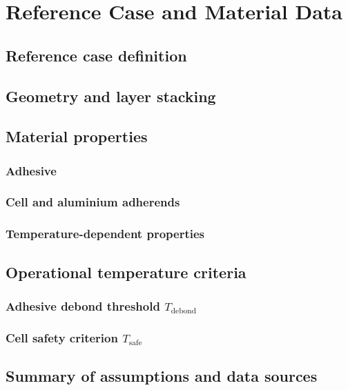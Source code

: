 \chapter{Reference Case and Material Data}

\section{Reference case definition}

\section{Geometry and layer stacking}

\section{Material properties}

\subsection{Adhesive}

\subsection{Cell and aluminium adherends}

\subsection{Temperature-dependent properties}

\section{Operational temperature criteria}

\subsection{Adhesive debond threshold $T_{\mathrm{debond}}$}

\subsection{Cell safety criterion $T_{\mathrm{safe}}$}

\section{Summary of assumptions and data sources}
